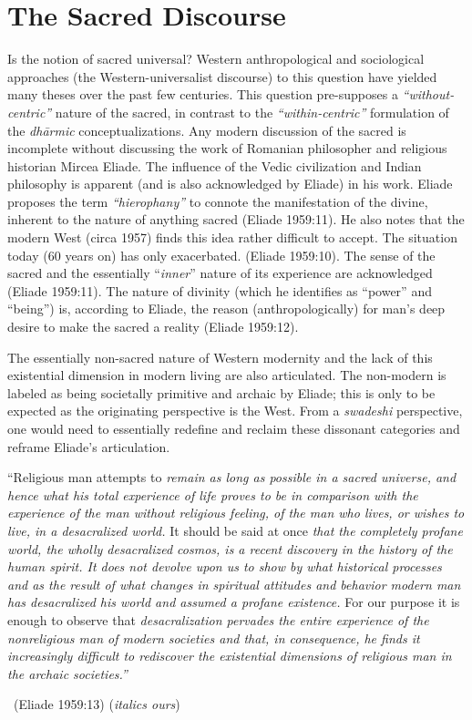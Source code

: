 \section*{The Sacred Discourse}

Is the notion of sacred universal? Western anthropological and sociological approaches (the Western-universalist discourse) to this question have yielded many theses over the past few centuries. This question pre-supposes a \textit{“without-centric”} nature of the sacred, in contrast to the \textit{“within-centric”} formulation of the \textit{dhārmic} conceptualizations. Any modern discussion of the sacred is incomplete without discussing the work of Romanian philosopher and religious historian Mircea Eliade. The influence of the Vedic civilization and Indian philosophy is apparent (and is also acknowledged by Eliade) in his work. Eliade proposes the term \textit{“hierophany”} to connote the manifestation of the divine, inherent to the nature of anything sacred (Eliade 1959:11). He also notes that the modern West (circa 1957) finds this idea rather difficult to accept. The situation today (60 years on) has only exacerbated. (Eliade 1959:10). The sense of the sacred and the essentially “\textit{inner}” nature of its experience are acknowledged (Eliade 1959:11). The nature of divinity (which he identifies as “power” and “being”) is, according to Eliade, the reason (anthropologically) for man's deep desire to make the sacred a reality (Eliade 1959:12).

The essentially non-sacred nature of Western modernity and the lack of this existential dimension in modern living are also articulated. The non-modern is labeled as being societally primitive and archaic by Eliade; this is only to be expected as the originating perspective is the West. From a \textit{swadeshi} perspective, one would need to essentially redefine and reclaim these dissonant categories and reframe Eliade's articulation.

\begin{myquote}
“Religious man attempts to \textit{remain as long as possible in a sacred universe, and hence what his total experience of life proves to be in comparison with the experience of the man without religious feeling, of the man who lives, or wishes to live, in a desacralized world.} It should be said at once \textit{that the completely profane world, the wholly desacralized cosmos, is a recent discovery in the history of the human spirit. It does not devolve upon us to show by what historical processes and as the result of what changes in spiritual attitudes and behavior modern man has desacralized his world and assumed a profane existence.} For our purpose it is enough to observe that \textit{desacralization pervades the entire experience of the nonreligious man of modern societies and that, in consequence, he finds it increasingly difficult to rediscover the existential dimensions of religious man in the archaic societies.”} 

~\hfill (Eliade 1959:13) (\textit{italics ours})
\end{myquote}

